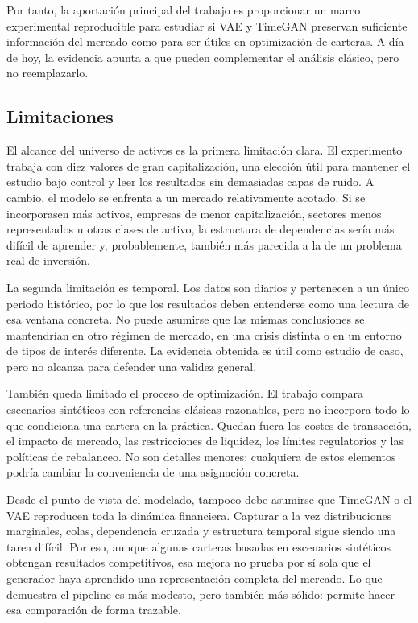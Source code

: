 \documentclass[11pt,a4paper,spanish,oneside]{book}
\numberwithin{equation}{chapter}
\numberwithin{figure}{chapter}
\begin{document}
Por tanto, la aportación principal del trabajo es proporcionar un marco experimental reproducible para estudiar si VAE y TimeGAN preservan suficiente información del mercado como para ser útiles en optimización de carteras. A día de hoy, la evidencia apunta a que pueden complementar el análisis clásico, pero no reemplazarlo.

\subsection{Limitaciones}

El alcance del universo de activos es la primera limitación clara. El experimento trabaja con diez valores de gran capitalización, una elección útil para mantener el estudio bajo control y leer los resultados sin demasiadas capas de ruido. A cambio, el modelo se enfrenta a un mercado relativamente acotado. Si se incorporasen más activos, empresas de menor capitalización, sectores menos representados u otras clases de activo, la estructura de dependencias sería más difícil de aprender y, probablemente, también más parecida a la de un problema real de inversión.

La segunda limitación es temporal. Los datos son diarios y pertenecen a un único periodo histórico, por lo que los resultados deben entenderse como una lectura de esa ventana concreta. No puede asumirse que las mismas conclusiones se mantendrían en otro régimen de mercado, en una crisis distinta o en un entorno de tipos de interés diferente. La evidencia obtenida es útil como estudio de caso, pero no alcanza para defender una validez general.

También queda limitado el proceso de optimización. El trabajo compara escenarios sintéticos con referencias clásicas razonables, pero no incorpora todo lo que condiciona una cartera en la práctica. Quedan fuera los costes de transacción, el impacto de mercado, las restricciones de liquidez, los límites regulatorios y las políticas de rebalanceo. No son detalles menores: cualquiera de estos elementos podría cambiar la conveniencia de una asignación concreta.

Desde el punto de vista del modelado, tampoco debe asumirse que TimeGAN o el VAE reproducen toda la dinámica financiera. Capturar a la vez distribuciones marginales, colas, dependencia cruzada y estructura temporal sigue siendo una tarea difícil. Por eso, aunque algunas carteras basadas en escenarios sintéticos obtengan resultados competitivos, esa mejora no prueba por sí sola que el generador haya aprendido una representación completa del mercado. Lo que demuestra el pipeline es más modesto, pero también más sólido: permite hacer esa comparación de forma trazable.
\end{document}
